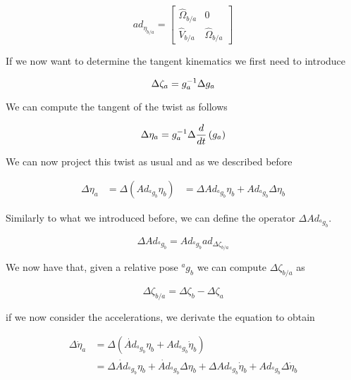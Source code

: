 \documentclass[12pt,a4paper]{book}
\newcommand{\agb}{\ensuremath{{^a g _b}}}
\newcommand{\etaa}{\ensuremath{{\eta_{a}}}}
\newcommand{\etab}{\ensuremath{{\eta_{b}}}}
\newcommand{\etaba}{\ensuremath{{\eta_{b/a}}}}
\newcommand{\dotetaa}{\ensuremath{{\dot{\eta}_{a}}}}
\newcommand{\dotetab}{\ensuremath{{\dot{\eta}_{b}}}}
\newcommand{\Adagb}{\ensuremath{Ad_{\agb}}}
\newcommand{\dotAdagb}{\ensuremath{\dot{Ad}_{\agb}}}
\newcommand{\adetaba}{\ensuremath{ad_{\etaba}}}
\newcommand{\Dzetaba}{\ensuremath{{\Delta \zeta_{b/a}}}}
\newcommand{\adDzetaba}{\ensuremath{ad_{\Dzetaba}}}
\begin{document}
\begin{equation}
	\adetaba = 
	\begin{bmatrix}
		\hat{\Omega}_{b/a}	&	0 \\
		\hat{V}_{b/a}			&	\hat{\Omega}_{b/a}
	\end{bmatrix}
\end{equation}


If we now want to determine the tangent kinematics we first need to introduce 

\begin{equation}\label{eq: Delta zeta}
	\Delta \zeta_{a} = g_a ^{-1} \Delta g_a
\end{equation}


We can compute the tangent of the twist as follows

\begin{equation}
	\Delta \etaa = g_a \inv \Delta \frac{d}{dt}\left(g_a \right)
\end{equation}

We can now project this twist as usual and as we described before

\begin{equation}
\begin{aligned}
	\Delta \etaa 	&= \Delta  \left( \Adagb \etab \right)
					&= \Delta \Adagb \etab  + \Adagb \Delta \etab 
\end{aligned}
\end{equation}

Similarly to what we introduced before, we can define the operator $\Delta \Adagb$.

\begin{equation}
	\Delta \Adagb = \Adagb \adDzetaba
\end{equation}



We now have that, given a relative pose \agb{} we can compute \Dzetaba{} as 

\begin{equation}
	\Dzetaba = \Delta \zeta _b - \Delta \zeta _a 
\end{equation}


if we now consider the accelerations, we derivate the equation to obtain 

\begin{equation}
\begin{aligned}
	\Delta \dotetaa 	&= \Delta  \left( \dotAdagb \etab + \Adagb \dotetab \right) \\
					&= 
\Delta \dotAdagb \etab+
\dotAdagb \Delta \etab
+
\Delta \Adagb \dotetab+
\Adagb \Delta \dotetab							
\end{aligned}
\end{equation}
\end{document}
